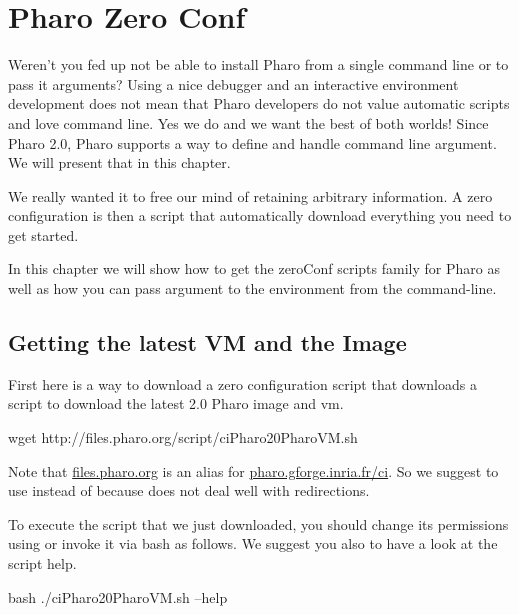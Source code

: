 \documentclass[a4paper,10pt,twoside]{book}
\begin{document}
\fi
\sloppy

\chapter{Pharo Zero Conf}

Weren't you fed up not be able to install Pharo from a single command line or to pass it arguments? 
Using a nice debugger and an interactive environment development does not 
mean that Pharo developers do not value automatic scripts and love command line. Yes we do and we want the best of
both worlds!
Since Pharo 2.0, Pharo supports a way to define and handle command line argument. 
We will present that in this chapter. 

We really wanted it to free our mind of retaining arbitrary information. 
A zero configuration is then a script that automatically download everything you need to get started. 

In this chapter we will show how to get the zeroConf scripts family for Pharo as well as how you can 
pass argument to the environment from the command-line.



\section{Getting the latest VM and the Image}
First here is a way to download a zero configuration script that downloads a script to download the latest 2.0 Pharo image and vm. 

\begin{code}{}
wget http://files.pharo.org/script/ciPharo20PharoVM.sh
\end{code}

Note that \url{files.pharo.org} is an alias for \url{pharo.gforge.inria.fr/ci}. 
So we suggest to use  instead of  because  does not deal well with redirections.

To execute the script that we just downloaded, you should change its  permissions using   or invoke it via bash as follows. We
suggest you also to have a look at the script help.

\begin{code}{}
bash ./ciPharo20PharoVM.sh --help 
\end{code}
\end{document}
